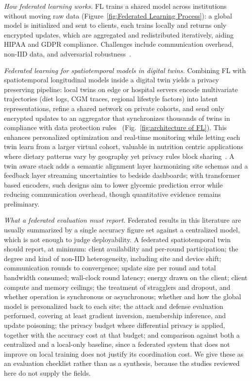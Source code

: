 \documentclass[journal]{IEEEtran}
\newif\ifsubmission
\begin{document}
\emph{How federated learning works.} FL trains a shared model across institutions without moving raw data\ifsubmission\else{} (Figure~\ref{fig:Federated Learning Process})\fi : a global model is initialized and sent to clients, each trains locally and returns only encrypted updates, which are aggregated and redistributed iteratively, aiding HIPAA and GDPR compliance. Challenges include communication overhead, non-IID data, and adversarial robustness~\cite{prayitno2021FLhealthcare,coelho2023FLsecurity}.


\emph{Federated learning for spatiotemporal models in digital twins.} Combining FL with spatiotemporal longitudinal models inside a digital twin yields a privacy preserving pipeline: local twins on edge or hospital servers encode multivariate trajectories (diet logs, CGM traces, regional lifestyle factors) into latent representations, refine a shared network on private cohorts, and send only encrypted updates to an aggregator that synchronizes thousands of twins in compliance with data protection rules~\cite{aouedi2022FLmedical}\ifsubmission\else{} (Fig.~\ref{fig:architecture of FL})\fi . This enhances personalized optimization and real-time monitoring while letting each twin learn from a larger virtual cohort, valuable in nutrition centric applications where dietary patterns vary by geography yet privacy rules block sharing~\cite{nguyen2022FLsmarthealthcare}. A twin aware stack adds a semantic alignment layer harmonizing site schemas and a feedback layer streaming uncertainties to bedside dashboards; with transformer based encoders, such designs aim to lower glycemic prediction error while reducing communication overhead, though quantitative evidence remains preliminary.

\emph{What a federated evaluation must report.} Federated results in this literature are usually summarized by a single accuracy figure set against a centralized model, which is not enough to judge deployability. A federated spatiotemporal twin should report, at minimum: client availability and per-round participation; the degree and kind of non-IID heterogeneity, including site and device shift; communication rounds to convergence; update size per round and total bandwidth consumed; wall-clock round latency; energy drawn on the client; client compute and memory ceilings; the treatment of stragglers and dropout, and whether operation is synchronous or asynchronous; whether and how the global model is personalized back to each site; the attack and defense evaluation performed, covering at least gradient inversion, membership inference, and update poisoning; the privacy budget where differential privacy is applied, together with the accuracy cost at that budget; and comparison against both a centralized and a local-only baseline, since a federated system that does not improve on local training does not justify its coordination cost. We give these as an evaluation checklist rather than as a synthesis, because the studies reviewed here do not supply the fields.
\end{document}
